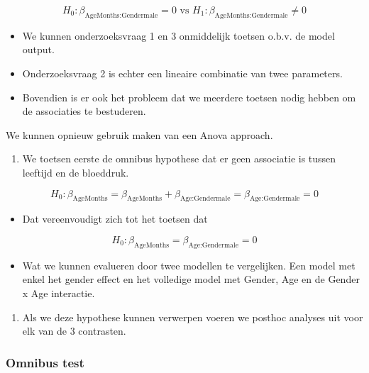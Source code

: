 \documentclass[
  12pt,dutch]{book}
\providecommand{\tightlist}{%
  \setlength{\itemsep}{0pt}\setlength{\parskip}{0pt}}
\theoremstyle{definition}
\theoremstyle{definition}
\theoremstyle{definition}
\theoremstyle{definition}
\theoremstyle{remark}
\begin{document}
\[H_0: \beta_\text{AgeMonths:Gendermale} = 0 \text{ vs } H_1: \beta_\text{AgeMonths:Gendermale} \neq 0
\]

\begin{itemize}
\tightlist
\item
  We kunnen onderzoeksvraag 1 en 3 onmiddelijk toetsen o.b.v. de model output.
\item
  Onderzoeksvraag 2 is echter een lineaire combinatie van twee parameters.
\item
  Bovendien is er ook het probleem dat we meerdere toetsen nodig hebben om de associaties te bestuderen.
\end{itemize}

We kunnen opnieuw gebruik maken van een Anova approach.

\begin{enumerate}
\def\labelenumi{\arabic{enumi}.}
\tightlist
\item
  We toetsen eerste de omnibus hypothese dat er geen associatie is tussen leeftijd en de bloeddruk.
\end{enumerate}

\[
H_0: \beta_\text{AgeMonths} = \beta_\text{AgeMonths} + \beta_\text{Age:Gendermale} = \beta_\text{Age:Gendermale} = 0
\]

\begin{itemize}
\tightlist
\item
  Dat vereenvoudigt zich tot het toetsen dat
\end{itemize}

\[
H_0: \beta_\text{AgeMonths} = \beta_\text{Age:Gendermale} = 0
\]

\begin{itemize}
\tightlist
\item
  Wat we kunnen evalueren door twee modellen te vergelijken. Een model met enkel het gender effect en het volledige model met Gender, Age en de Gender x Age interactie.
\end{itemize}

\begin{enumerate}
\def\labelenumi{\arabic{enumi}.}
\setcounter{enumi}{1}
\tightlist
\item
  Als we deze hypothese kunnen verwerpen voeren we posthoc analyses uit voor elk van de 3 contrasten.
\end{enumerate}

\subsubsection{Omnibus test}\label{omnibus-test}
\end{document}
